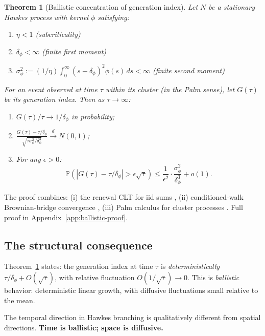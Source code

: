 \documentclass[11pt,a4paper]{article}
\newtheorem{theorem}{Theorem}
\begin{document}
\begin{theorem}[Ballistic concentration of generation index]
\label{thm:ballistic}
Let $N$ be a stationary Hawkes process with kernel $\phi$ satisfying:
\begin{enumerate}
\item[(K1)] $\eta < 1$ (subcriticality)
\item[(K2)] $\delta_\phi < \infty$ (finite first moment)
\item[(K3)] $\sigma_\phi^2 := (1/\eta)\int_0^\infty (s - \delta_\phi)^2 \phi(s)\,ds < \infty$ (finite second moment)
\end{enumerate}
For an event observed at time $\tau$ within its cluster (in the Palm sense), let $G(\tau)$ be its generation index. Then as $\tau \to \infty$:
\begin{enumerate}
\item[(a)] $G(\tau)/\tau \to 1/\delta_\phi$ in probability;
\item[(b)] $\displaystyle\frac{G(\tau) - \tau/\delta_\phi}{\sqrt{\tau \sigma_\phi^2/\delta_\phi^3}} \xrightarrow{d} N(0, 1)$;
\item[(c)] For any $\epsilon > 0$:
\begin{equation}
\mathbb{P}\left(|G(\tau) - \tau/\delta_\phi| > \epsilon\sqrt{\tau}\right) \leq \frac{1}{\epsilon^2} \cdot \frac{\sigma_\phi^2}{\delta_\phi^3} + o(1).
\end{equation}
\end{enumerate}
\end{theorem}

The proof combines: (i) the renewal CLT for iid sums \cite{Feller1971}, (ii) conditioned-walk Brownian-bridge convergence \cite{CsorgoHorvath1993}, (iii) Palm calculus for cluster processes \cite{DaleyVereJones2003}. Full proof in Appendix~\ref{app:ballistic-proof}.

\subsection{The structural consequence}

Theorem~\ref{thm:ballistic} states: the generation index at time $\tau$ is \emph{deterministically} $\tau/\delta_\phi + O(\sqrt{\tau})$, with relative fluctuation $O(1/\sqrt{\tau}) \to 0$. This is \emph{ballistic} behavior: deterministic linear growth, with diffusive fluctuations small relative to the mean.

The temporal direction in Hawkes branching is qualitatively different from spatial directions. \textbf{Time is ballistic; space is diffusive.}
\end{document}

